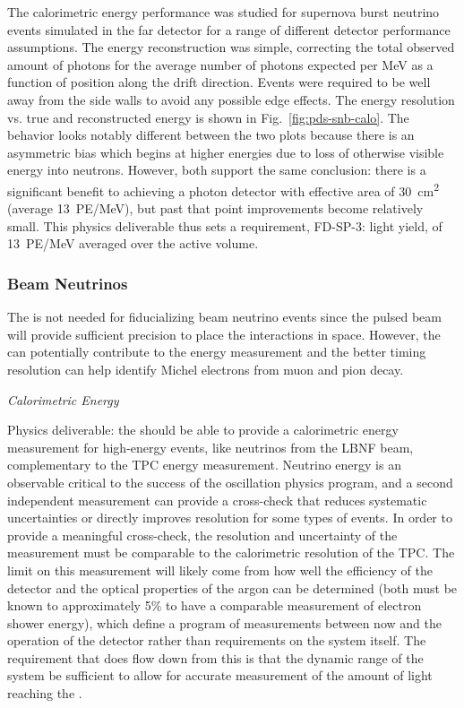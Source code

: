 The calorimetric energy performance was studied for supernova burst neutrino events simulated in the far detector for a range of different detector performance assumptions. The energy reconstruction was simple, correcting the total observed amount of photons for the average number of photons expected per MeV as a function of position along the drift direction. Events were required to be well away from the side walls to avoid any possible edge effects. The energy resolution vs. true and reconstructed energy is shown in Fig.~\ref{fig:pds-snb-calo}. The behavior looks notably different between the two plots because there is an asymmetric bias which begins at higher energies due to loss of otherwise visible energy into neutrons. However, both support the same conclusion: there is a significant benefit to achieving a photon detector with effective area of \SI{30}{cm^2} (average \SI{13}{PE/MeV}), but past that point improvements become relatively small. This physics deliverable thus sets a requirement, FD-SP-3: light yield, of \SI{13}{PE/MeV} averaged over the active volume.

\subsubsection{Beam Neutrinos}

The  is not needed for fiducializing beam neutrino events since the pulsed beam will provide sufficient precision to place the interactions in space. However, the  can potentially contribute to the energy measurement and the better timing resolution can help identify Michel electrons from muon and pion decay.


\textit{\it Calorimetric Energy}

Physics deliverable: the  should be able to provide a calorimetric energy measurement for high-energy events, like neutrinos from the LBNF beam, complementary to the TPC energy measurement.
Neutrino energy is an observable critical to the success of the oscillation physics program, and a second independent measurement can provide a cross-check that reduces systematic uncertainties or directly improves resolution for some types of events. In order to provide a meaningful cross-check, the resolution and uncertainty of the  measurement must be comparable to the calorimetric resolution of the TPC. The limit on this measurement will likely come from how well the efficiency of the detector and the optical properties of the argon can be determined (both must be known to approximately 5\% to have a comparable measurement of electron shower energy), which define a program of measurements between now and the operation of the detector rather than requirements on the system itself. The requirement that does flow down from this is that the dynamic range of the system be sufficient to allow for accurate measurement of the amount of light reaching the . 

